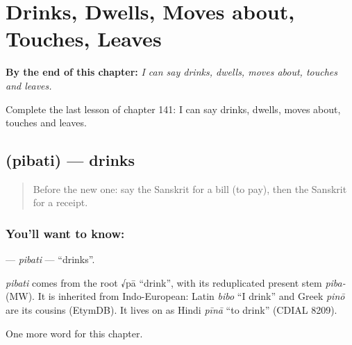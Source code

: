 
\chapter{Drinks, Dwells, Moves about, Touches, Leaves}
\label{ch:sa-drinks-dwells-moves-about-touches-leaves}

\begin{chapteropening}
\textbf{By the end of this chapter:} \emph{I can say drinks, dwells, moves about, touches and leaves.}

Complete the last lesson of chapter 141: I can say drinks, dwells, moves about, touches and leaves.
\end{chapteropening}

\section[\texorpdfstring{\sk{पिबति} (pibati)}{पिबति (pibati)}]{ (pibati) — drinks}

\label{lesson:SA-C141-pibati}



\begin{quote}
Before the new one: say the Sanskrit for a bill (to pay), then the Sanskrit for a receipt.
\end{quote}

\subsection*{You'll want to know: }
\textbf{} — \emph{pibati} — \textquotedblleft{}drinks\textquotedblright{}.

\begin{cousinweb}
\emph{pibati} comes from the root √pā \textquotedblleft{}drink\textquotedblright{}, with its reduplicated present stem \emph{piba-} (MW). It is inherited from Indo-European: Latin \emph{bibo} \textquotedblleft{}I drink\textquotedblright{} and Greek \emph{pinō} are its cousins (EtymDB). It lives on as Hindi \emph{pīnā} \textquotedblleft{}to drink\textquotedblright{} (CDIAL 8209).
\end{cousinweb}

\begin{grammarlens}[title={What you've built}]
One more word for this chapter.
\end{grammarlens}

